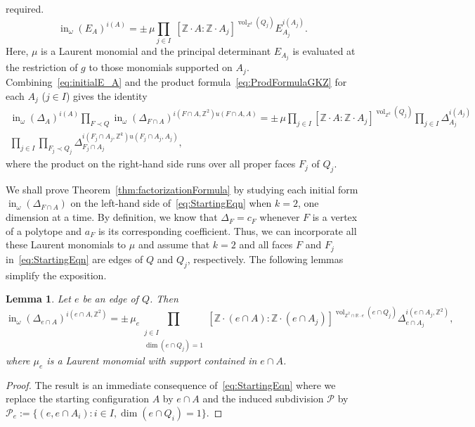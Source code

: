 \documentclass[11pt]{amsart}
\numberwithin{equation}{section}
\theoremstyle{plain}
\newtheorem{lemma}[theorem]{Lemma}
\theoremstyle{definition}
\theoremstyle{remark}
\begin{document}
required. 
\begin{equation}
  \label{eq:initialE_A}
  \operatorname{in}_{\omega}(E_A)^{i(A)}=\pm \, \mu \prod_{j\in I}\;[{\mathbb{Z}}{\!\cdot\!} A: {\mathbb{Z}}{\!\cdot\!} A_j]^{\operatorname{\operatorname{vol}}_{{\mathbb{Z}}^k}(Q_j)} E_{A_j}^{i(A_j)}.
\end{equation}
Here, $\mu$ is a Laurent monomial and the principal determinant
$E_{A_j}$ is evaluated at the restriction of $g$ to those monomials supported on $A_j$.
Combining~\eqref{eq:initialE_A} and the product formula~\eqref{eq:ProdFormulaGKZ} for each $A_j$ ($j\in I$) gives the identity
\begin{equation}
  \label{eq:StartingEqn}
  \begin{split}
    \operatorname{in}_{\omega}(\Delta_A)^{i(A)}\prod_{F\prec
      Q}\operatorname{in}_{\omega}(\Delta_{F\cap A})^{i(F\cap A, {\mathbb{Z}}^2)u(F\cap A,A)}=
    \pm \,\mu \prod_{j\in I} [{\mathbb{Z}}{\!\cdot\!} A: {\mathbb{Z}}{\!\cdot\!} A_j]^{\operatorname{\operatorname{vol}}_{{\mathbb{Z}}^k}(Q_j)} \prod_{j\in I}\Delta_{A_j}^{i(A_j)}\\
    \prod_{j\in I}\prod_{F_j\prec Q_j} \Delta_{F_j\cap A_j}^{i(F_j\cap
      A_j, {\mathbb{Z}}^k)u(F_j\cap A_j,A_j)},
  \end{split}
\end{equation}
where the product on the right-hand side runs over all proper faces $F_j$ of $Q_j$. 

We shall prove Theorem~\ref{thm:factorizationFormula} by studying each
initial form $\operatorname{in}_{\omega}(\Delta_{F\cap A})$ on the left-hand side
of~\eqref{eq:StartingEqn} when $k=2$, one dimension at a time. By
definition, we know that $\Delta_{F}=c_F$ whenever $F$ is a vertex of
a polytope and $a_F$ is its corresponding coefficient. Thus, we can
incorporate all these Laurent monomials to $\mu$ and assume that $k=2$
and all faces $F$ and $F_j$ in~\eqref{eq:StartingEqn} are edges of $Q$
and $Q_j$, respectively. The following lemmas simplify the exposition.

\begin{lemma}\label{lm:valueEdges}
  Let $e
  $ be an edge of $Q$. Then
\[
\operatorname{in}_{\omega}(\Delta_{e\cap A})^{i(e\cap A,{\mathbb{Z}}^2)} = \pm \,\mu_e\!\!\!\!\! \prod_{\substack{j\in I\\\dim(e\cap Q_j)=1}}[{\mathbb{Z}}{\!\cdot\!}(e\cap A): {\mathbb{Z}}{\!\cdot\!}(e \cap A_j)]^{\operatorname{\operatorname{vol}}_{{\mathbb{Z}}^2\cap {\mathbb{R}}\cdot e}(e\cap Q_j)} \Delta_{ e\cap A_j}^{i(e \cap A_j , {\mathbb{Z}}^2)},
\]
where $\mu_e$ is a Laurent monomial with support contained in $e\cap A$.
\end{lemma}
\begin{proof}
  The result is an immediate consequence of~\eqref{eq:StartingEqn}
  where we replace the starting configuration $A$ by $e\cap A$ and the
  induced subdivision ${\mathcal{P}}$ by ${\mathcal{P}}_{e}:= \{(e,e\cap A_i): i\in I,
  \dim(e\cap Q_i)=1\}$.
\end{proof}
\end{document}
